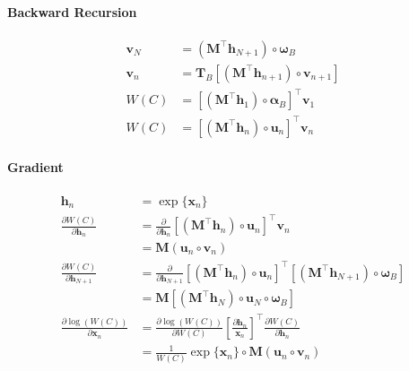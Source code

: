 \paragraph{Backward Recursion}
\begin{align}
    \mathbf{v}_{N} &= (\mathbf{M}^\top \mathbf{h}_{N+1}) \circ  \boldsymbol{\omega}_B \\
    \mathbf{v}_n &= \mathbf{T}_B [ (\mathbf{M}^\top \mathbf{h}_{n+1}) \circ \mathbf{v}_{n+1} ] \\
    W(C) &= [(\mathbf{M}^\top \mathbf{h}_1) \circ \boldsymbol{\alpha}_B]^\top \mathbf{v}_1 \\
    W(C) &= [(\mathbf{M}^\top \mathbf{h}_n) \circ \mathbf{u}_n]^\top \mathbf{v}_n
\end{align}

\paragraph{Gradient}
\begin{align}
    \mathbf{h}_n &= \exp\{\mathbf{x}_n\} \\
    \frac{\partial W(C)}{\partial \mathbf{h}_n} &= 
        \frac{\partial}{\partial \mathbf{h}_n}
        [(\mathbf{M}^\top \mathbf{h}_n) \circ \mathbf{u}_n]^\top \mathbf{v}_n \\
    &= \mathbf{M}(\mathbf{u}_n \circ \mathbf{v}_n)\\
    \frac{\partial W(C)}{\partial \mathbf{h}_{N+1}} &= 
        \frac{\partial}{\partial \mathbf{h}_{N+1}}
        [(\mathbf{M}^\top \mathbf{h}_n) \circ \mathbf{u}_n]^\top
        [(\mathbf{M}^\top \mathbf{h}_{N+1}) \circ  \boldsymbol{\omega}_B] \\
    &= \mathbf{M}[(\mathbf{M}^\top\mathbf{h}_N) \circ \mathbf{u}_N \circ \boldsymbol{\omega}_B]\\
    \frac{\partial \log\left(W(C)\right)}{\partial \mathbf{x}_n} &= 
        \frac{\partial \log\left(W(C)\right)}{\partial W(C)}
        \left[
            \frac{\partial \mathbf{h}_n}{\mathbf{x}_n}
        \right]^\top 
        \frac{\partial W(C)}{\partial \mathbf{h}_n}\\
    &= \frac{1}{W(C)} \exp\{\mathbf{x}_n\} \circ \mathbf{M}(\mathbf{u}_n \circ \mathbf{v}_n)
\end{align}